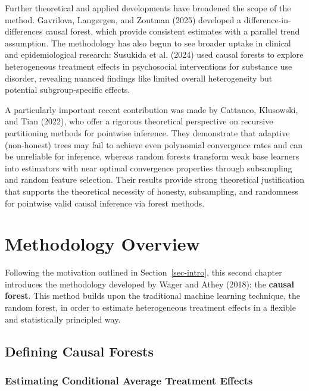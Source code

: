 \documentclass[
  12pt,
  a4paper,
  oneside]{article}
\begin{document}
\qquad Further theoretical and applied developments have broadened the
scope of the method. Gavrilova, Langørgen, and Zoutman (2025) developed
a difference-in-differences causal forest, which provide consistent
estimates with a parallel trend assumption. The methodology has also
begun to see broader uptake in clinical and epidemiological research:
Susukida et al. (2024) used causal forests to explore heterogeneous
treatment effects in psychosocial interventions for substance use
disorder, revealing nuanced findings like limited overall heterogeneity
but potential subgroup-specific effects.

\qquad A particularly important recent contribution was made by
Cattaneo, Klusowski, and Tian (2022), who offer a rigorous theoretical
perspective on recursive partitioning methods for pointwise inference.
They demonstrate that adaptive (non-honest) trees may fail to achieve
even polynomial convergence rates and can be unreliable for inference,
whereas random forests transform weak base learners into estimators with
near optimal convergence properties through subsampling and random
feature selection. Their results provide strong theoretical
justification that supports the theoretical necessity of honesty,
subsampling, and randomness for pointwise valid causal inference via
forest methods.

\section{Methodology Overview}\label{methodology-overview}

Following the motivation outlined in Section~\ref{sec-intro}, this
second chapter introduces the methodology developed by Wager and Athey
(2018): the \textbf{causal forest}. This method builds upon the
traditional machine learning technique, the random forest, in order to
estimate heterogeneous treatment effects in a flexible and statistically
principled way.

\subsection{Defining Causal Forests}\label{sec-causal-forests}

\subsubsection{Estimating Conditional Average Treatment
Effects}\label{estimating-conditional-average-treatment-effects}
\end{document}
